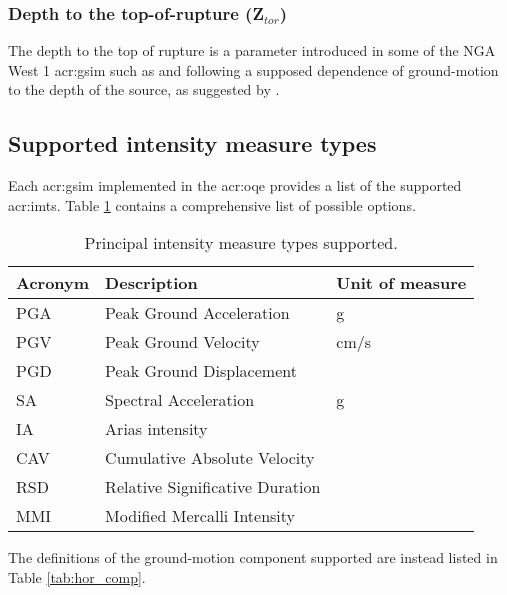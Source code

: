 \subsubsection{Depth to the top-of-rupture (Z$_{tor}$)}
The depth to the top of rupture is a parameter introduced in some of the NGA
West 1 \gls{acr:gsim} such as \textcite{chiou2008} and \textcite{abrahamson2008}
following a supposed dependence of ground-motion to the depth of the source,
as suggested by \textcite{somerville2006a}.
%
\subsection{Supported intensity measure types}
Each \gls{acr:gsim} implemented in the \gls{acr:oqe} provides a list of the 
supported \glspl{acr:imt}. Table \ref{tab:imts} contains a comprehensive list 
of possible options.
\begin{table}[!h]
\centering
\begin{tabular}{|p{3cm}p{5cm}p{3cm}|}
\hline
\rowcolor{anti-flashwhite}
\bf{Acronym} & \bf{Description} & \bf{Unit of measure} \\
\hline 
PGA & Peak Ground Acceleration & g \\
PGV & Peak Ground Velocity     & cm/s \\
PGD & Peak Ground Displacement & \\
SA  & Spectral Acceleration    & g \\
IA  & Arias intensity &  \\
CAV & Cumulative Absolute Velocity &  \\
RSD & Relative Significative Duration \parencite{trifunac1975}&  \\
MMI & Modified Mercalli Intensity &  \\
\hline
\end{tabular}
\caption{Principal intensity measure types supported.}
\label{tab:imts}
\end{table}
The definitions of the ground-motion component supported are instead listed in
Table \ref{tab:hor_comp}. 

